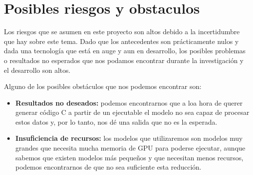 \section{Posibles riesgos y obstaculos}
\label{sec:riesgos}


Los riesgos que se asumen en este proyecto son altos debido a la incertidumbre que hay sobre este tema. Dado que los antecedentes son prácticamente nulos y dada una tecnología
que está en auge y aun en desarrollo, los posibles problemas o resultados no esperados que nos podamos encontrar durante la investigación y el desarrollo son altos.

Alguno de los posibles obstáculos que nos podemos encontrar son:

\begin{itemize}
    \item \textbf{Resultados no deseados:} podemos encontrarnos que a loa hora de querer generar código C a partir de un ejecutable el modelo no sea capaz de procesar estos datos
                                        y, por lo tanto, nos dé una salida que no es la esperada.
    \item \textbf{Insuficiencia de recursos:} los modelos que utilizaremos son modelos muy grandes que necesita mucha memoria de GPU para poderse ejecutar, aunque sabemos que
                                        existen modelos más pequeños y que necesitan menos recursos, podemos encontrarnos de que no sea suficiente esta reducción.
\end{itemize}